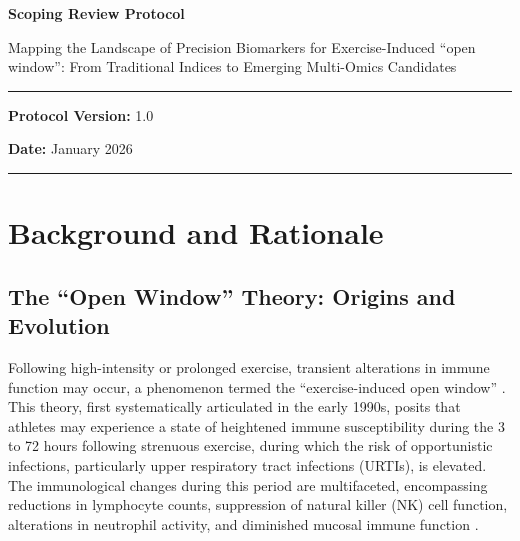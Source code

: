 \documentclass[12pt,a4paper]{article}
\newcommand{\openwindow}{``open window''}
\begin{document}
\begin{titlepage}
\centering
\vspace*{2cm}

{\Huge\bfseries Scoping Review Protocol\par}
\vspace{1.5cm}

{\LARGE Mapping the Landscape of Precision Biomarkers for Exercise-Induced \openwindow: From Traditional Indices to Emerging Multi-Omics Candidates\par}
\vspace{2cm}

\hrule
\vspace{1cm}

{\large\bfseries Protocol Version:} 1.0\par
\vspace{0.5cm}
{\large\bfseries Date:} January 2026\par

\vspace{1cm}
\hrule

\vfill
\end{titlepage}

\section{Background and Rationale}

\subsection{The ``Open Window'' Theory: Origins and Evolution}

Following high-intensity or prolonged exercise, transient alterations in immune function may occur, a phenomenon termed the ``exercise-induced open window'' \citep{nieman1994exercise}. This theory, first systematically articulated in the early 1990s, posits that athletes may experience a state of heightened immune susceptibility during the 3 to 72 hours following strenuous exercise, during which the risk of opportunistic infections, particularly upper respiratory tract infections (URTIs), is elevated. The immunological changes during this period are multifaceted, encompassing reductions in lymphocyte counts, suppression of natural killer (NK) cell function, alterations in neutrophil activity, and diminished mucosal immune function \citep{nieman1994exercise,gleeson2007immune}.
\end{document}
